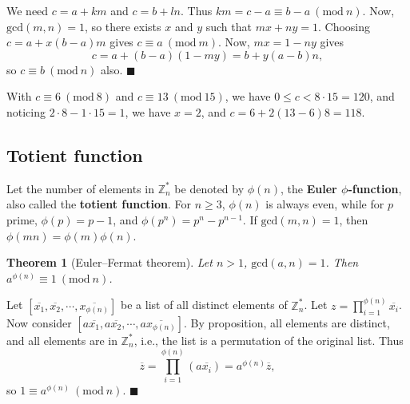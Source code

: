 \documentclass[letter-paper]{tufte-book}
\newtheorem{theorem}{\color{pastel-blue}Theorem}[section]
\newenvironment{proof}[1][Proof]{\begin{trivlist}
\item[\hskip \labelsep {\bfseries #1}]}{\end{trivlist}}
\newenvironment{example}[1][Example]{\begin{trivlist}
\item[\hskip \labelsep {\bfseries #1}]}{\end{trivlist}}
\newcommand\Def[1]{\textbf{#1}}
\newcommand{\qed}{\hfill$\blacksquare$}
\begin{document}
\begin{proof}
  We need $c=a+km$ and $c=b+ln$. Thus $km=c-a\equiv b-a\ (\mbox{mod}\ n)$. Now,
  $\mbox{gcd}(m,n)=1$, so there exists $x$ and $y$ such that $mx+ny=1$. Choosing
  $c=a+x(b-a)m$ gives $c\equiv a\ (\mbox{mod}\ m)$. Now, $mx=1-ny$ gives
  \begin{equation*}
    c=a+(b-a)(1-my)=b+y(a-b)n,
  \end{equation*}
  so $c\equiv b\ (\mbox{mod}\ n)$ also. \qed
\end{proof}

\begin{example}
  With $c\equiv 6\ (\mbox{mod}\ 8)$ and $c\equiv13\ (\mbox{mod}\ 15)$, we have
  $0\leq c<8\cdot15=120$, and noticing $2\cdot8-1\cdot15=1$, we have $x=2$, and
  $c=6+2(13-6)8=118$.
\end{example}


\subsection{Totient function}

Let the number of elements in $\mathbb{Z}_n^*$ be denoted by $\phi(n)$, the
\Def{Euler $\phi$-function}, also called the \Def{totient function}.
For $n\geq3$, $\phi(n)$ is always even, while for $p$ prime, $\phi(p)=p-1$, and
$\phi(p^n)=p^n-p^{n-1}$. If $\mbox{gcd}(m,n)=1$, then $\phi(mn)=\phi(m)\phi(n)$.

\begin{theorem}[Euler--Fermat theorem]
  Let $n>1$, $\mbox{gcd}(a,n)=1$. Then $a^{\phi(n)}\equiv1\ (\mbox{mod}\ n)$.
\end{theorem}
\begin{proof}
  Let $[\overline{x_1},\overline{x_2},\cdots,\overline{x_{\phi(n)}}]$ be a list
  of all distinct elements of $\mathbb{Z}_n^*$. Let
  $z=\prod_{i=1}^{\phi(n)}\overline{x_i}$. Now consider
  $[a\overline{x_1},a\overline{x_2},\cdots,a\overline{x_{\phi(n)}}]$. By
  proposition, all elements are distinct, and all elements are in
  $\mathbb{Z}_n^*$, i.e., the list is a permutation of the original list. Thus
  \begin{equation*}
    \overline{z}=\prod_{i=1}^{\phi(n)}(a\overline{x_i})=a^{\phi(n)}\overline{z},
  \end{equation*}
  so $1\equiv a^{\phi(n)}\ (\mbox{mod}\ n)$. \qed
\end{proof}
\end{document}
